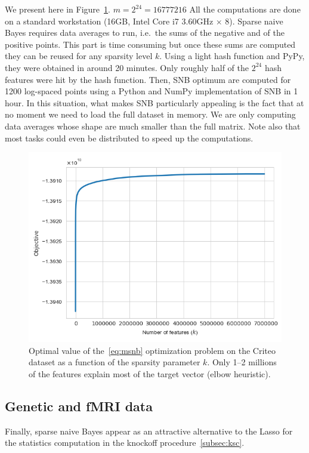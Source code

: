 We present here in Figure~\ref{fig:criteo_hash_elbow}.
$m = 2^{24} = 16777216$
All the computations are done on a standard workstation (16GB, Intel Core i7 3.60GHz $\times$ 8).
Sparse naive Bayes requires data averages to run,
i.e.\ the sums of the negative and of the positive points.
This part is time consuming but once these sums are computed they can be reused for any sparsity level $k$.
Using a light hash function and PyPy, they were obtained in around 20 minutes.
Only roughly half of the $2^{24}$ hash features were hit by the hash function.
Then, SNB optimum are computed for 1200 log-spaced points using a Python and NumPy implementation of SNB in 1 hour.
In this situation, what makes SNB particularly appealing is the fact that at no moment we need to load the full dataset
in memory.
We are only computing data averages whose shape are much smaller than the full matrix.
Note also that most tasks could even be distributed to speed up the computations.
\begin{figure}
    \centering
    \includegraphics[width=0.75\linewidth, height=0.4\linewidth]{figures/criteo_hash_elbow.png}
    \caption{
        Optimal value of the~\ref{eq:msnb} optimization problem on the Criteo dataset
        as a function of the sparsity parameter $k$.
        Only 1--2 millions of the features explain most of the target vector (elbow heuristic).
    }
    \label{fig:criteo_hash_elbow}
\end{figure}

\subsection{Genetic and fMRI data}\label{subsec:snb_genetic_fmri}



\bigbreak
Finally, sparse naive Bayes appear as an attractive alternative to the Lasso for the statistics computation
in the knockoff procedure~\ref{subsec:ksc}.
